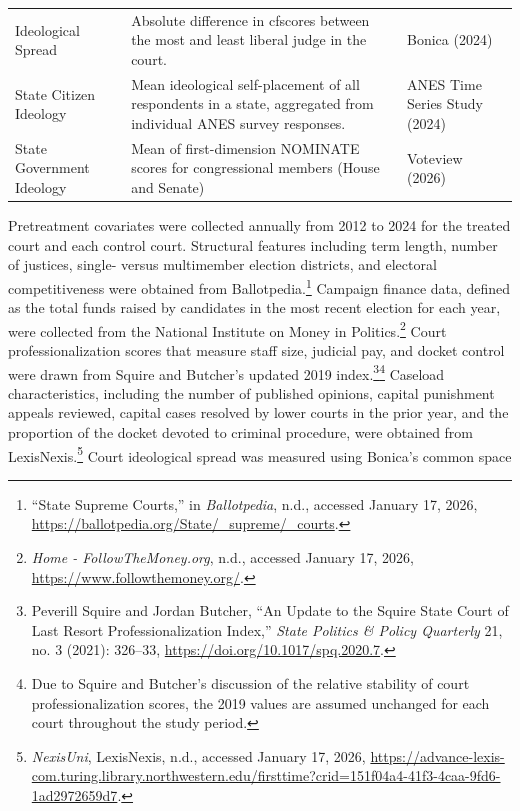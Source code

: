 \begin{table}[htbp]
\begin{tabularx}{\textwidth}{@{} V H >{\raggedright\arraybackslash}p{3.6cm} @{}}
Ideological Spread &
Absolute difference in cfscores between the most and least liberal judge in the court. &
Bonica (2024) \\

State Citizen Ideology &
Mean ideological self-placement of all respondents in a state, aggregated from individual ANES survey responses. &
ANES Time Series Study (2024) \\

State Government Ideology &
Mean of first-dimension NOMINATE scores for congressional members (House and Senate) &
Voteview (2026) \\
\bottomrule
\end{tabularx}
\end{table}

Pretreatment covariates were collected annually from 2012 to 2024 for
the treated court and each control court. Structural features including
term length, number of justices, single- versus multimember election
districts, and electoral competitiveness were obtained from
Ballotpedia.\footnote{{``State Supreme Courts,''} in \emph{Ballotpedia},
  n.d., accessed January 17, 2026,
  \url{https://ballotpedia.org/State/_supreme/_courts}.} Campaign
finance data, defined as the total funds raised by candidates in the
most recent election for each year, were collected from the National
Institute on Money in Politics.\footnote{\emph{Home -
  {FollowTheMoney}.org}, n.d., accessed January 17, 2026,
  \url{https://www.followthemoney.org/}.} Court professionalization
scores that measure staff size, judicial pay, and docket control were
drawn from Squire and Butcher's updated 2019
index.\footnote{Peverill Squire and Jordan Butcher, {``An {Update} to
  the {Squire State Court} of {Last Resort Professionalization
  Index},''} \emph{State Politics \& Policy Quarterly} 21, no. 3 (2021):
  326--33, \url{https://doi.org/10.1017/spq.2020.7}.}\footnote{Due to
  Squire and Butcher's discussion of the relative stability of court
  professionalization scores, the 2019 values are assumed unchanged for
  each court throughout the study period.} Caseload characteristics,
including the number of published opinions, capital punishment appeals
reviewed, capital cases resolved by lower courts in the prior year, and
the proportion of the docket devoted to criminal procedure, were
obtained from LexisNexis.\footnote{\emph{{NexisUni}}, LexisNexis, n.d.,
  accessed January 17, 2026,
  \url{https://advance-lexis-com.turing.library.northwestern.edu/firsttime?crid=151f04a4-41f3-4caa-9fd6-1ad2972659d7}.}
Court ideological spread was measured using Bonica's common space
